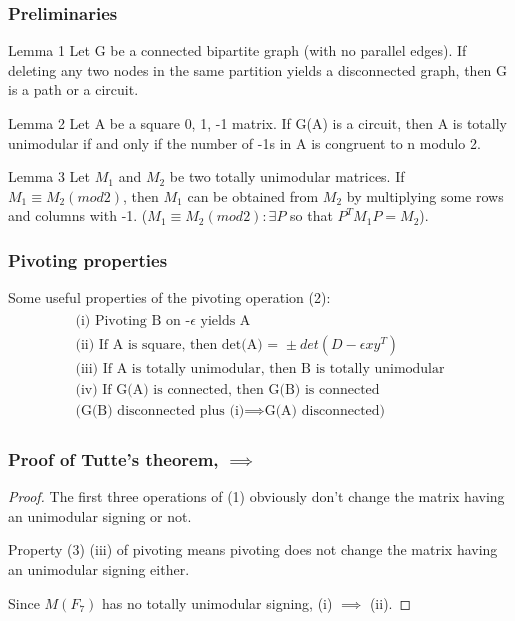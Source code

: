 \documentclass{beamer}
\begin{document}
\begin{frame}
\frametitle{Preliminaries}
\begin{block}{Lemma 1}
Let G be a connected bipartite graph (with no parallel edges). If deleting any two nodes in the same partition yields a disconnected graph, then G is a path or a circuit. 
\end{block}
\begin{block}{Lemma 2}
Let A be a square {0, 1, -1} matrix. If G(A) is a circuit, then A is totally unimodular if and only if the number of -1s in A is congruent to n modulo 2.
\end{block}
\begin{block}{Lemma 3}
Let $M_1$ and $M_2$ be two totally unimodular matrices. If $M_1 \equiv M_2 (mod 2)$, then $M_1$ can be obtained from $M_2$ by multiplying some rows and columns with -1. ($M_1 \equiv M_2 (mod 2): \exists P$ so that $P^T M_1 P = M_2$).
\end{block}
\end{frame}


\begin{frame}
\frametitle{Pivoting properties}
Some useful properties of the pivoting operation (2):
\begin{gather}
\begin{aligned}
\text{(i) Pivoting B on -}\epsilon\text{ yields A}\\
\text{(ii) If A is square, then det(A) = }\pm det(D - \epsilon x y^T)\\
\text{(iii) If A is totally unimodular, then B is totally unimodular}\\
\text{(iv) If G(A) is connected, then G(B) is connected}\\
\text{(G(B) disconnected plus (i)}\implies\text{G(A) disconnected)}
\end{aligned}
\end{gather}
\end{frame}

\begin{frame}
\frametitle{Proof of Tutte's theorem, $\implies$}
\begin{proof}
The first three operations of (1) obviously don't change the matrix having an unimodular signing or not.\par
Property (3) (iii) of pivoting means pivoting does not change the matrix having an unimodular signing either.\par
Since $M(F_7)$ has no totally unimodular signing, (i) $\implies$ (ii).
\end{proof}
\end{frame}
\end{document}
